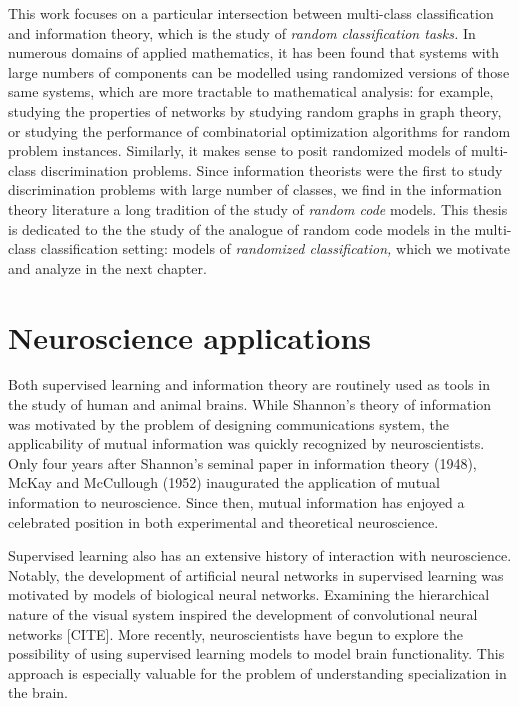 This work focuses on a particular intersection between multi-class
classification and information theory, which is the study of
\emph{random classification tasks.}  In numerous domains of applied
mathematics, it has been found that systems with large numbers of
components can be modelled using randomized versions of those same
systems, which are more tractable to mathematical analysis: for
example, studying the properties of networks by studying random graphs
in graph theory, or studying the performance of combinatorial
optimization algorithms for random problem instances.  Similarly, it
makes sense to posit randomized models of multi-class discrimination
problems.  Since information theorists were the first to study
discrimination problems with large number of classes, we find in the
information theory literature a long tradition of the study of
\emph{random code} models.  This thesis is dedicated to the the study
of the analogue of random code models in the multi-class
classification setting: models of \emph{randomized classification,}
which we motivate and analyze in the next chapter.





\iffalse

\section{Neuroscience applications}

Both supervised learning and information theory are routinely used as
tools in the study of human and animal brains.  While Shannon's theory
of information was motivated by the problem of designing
communications system, the applicability of mutual information was
quickly recognized by neuroscientists.  Only four years after
Shannon's seminal paper in information theory (1948), McKay and
McCullough (1952) inaugurated the application of mutual information to
neuroscience. Since then, mutual information has enjoyed a celebrated
position in both experimental and theoretical neuroscience.

Supervised learning also has an extensive history of interaction with
neuroscience.  Notably, the development of artificial neural networks
in supervised learning was motivated by models of biological neural
networks.  Examining the hierarchical nature of the visual system
inspired the development of convolutional neural networks [CITE].
More recently, neuroscientists have begun to explore the possibility
of using supervised learning models to model brain functionality.
This approach is especially valuable for the problem of understanding
specialization in the brain.

